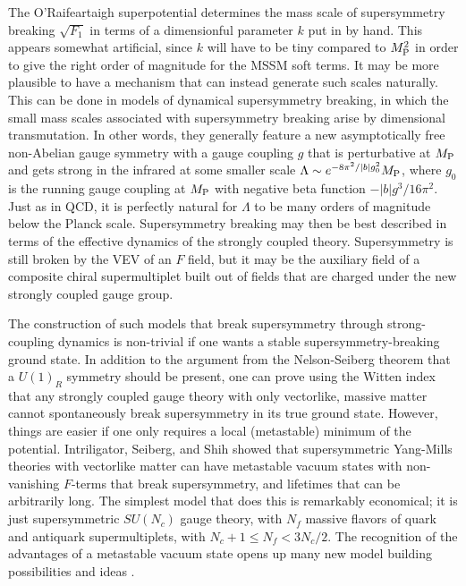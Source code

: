 \documentclass[11pt]{article}
\def\MPlanck{M_{\rm P}}
\begin{document}
The O'Rai\-f\-ear\-taigh superpotential determines the mass scale of
supersymmetry breaking $\sqrt{F_1}$ in terms of a dimensionful parameter
$k$ put in by hand. This appears somewhat artificial, since $k$ will have
to be tiny compared to $\MPlanck^2$ in order to give the right order of
magnitude for the MSSM soft terms. It may be more plausible to have a mechanism that
can instead generate such scales naturally. This can be done in models of
dynamical supersymmetry breaking, in which the small 
mass scales associated with supersymmetry breaking arise by
dimensional transmutation. In other words, they generally feature a new
asymptotically free non-Abelian gauge symmetry with a gauge coupling $g$
that is perturbative at $\MPlanck$ and gets strong in the infrared at some
smaller scale $\Lambda \sim e^{-8\pi^2/|b| g_0^2} \MPlanck$, where $g_0$
is the running gauge coupling at $\MPlanck$ with negative beta function $-
|b| g^3/16 \pi^2$. Just as in QCD, it is perfectly natural for $\Lambda$
to be many orders of magnitude below the Planck scale. Supersymmetry
breaking may then be best described in terms of the effective dynamics of
the strongly coupled theory. 
Supersymmetry is still broken by the VEV of an $F$ field, but it may be
the auxiliary field of a composite chiral supermultiplet built out
of fields that are charged under the new strongly coupled gauge group.

The construction of such models that break supersymmetry through strong-coupling dynamics is 
non-trivial if one wants a stable supersymmetry-breaking ground state. In addition to the 
argument from the Nelson-Seiberg theorem that a $U(1)_R$ symmetry should be present, one can 
prove using the Witten index \cite{Wittenindex,AffleckDineSeiberg} that any strongly coupled 
gauge theory with only vectorlike, massive matter cannot spontaneously break supersymmetry in 
its true ground state. However, things are easier if one only requires a local (metastable) 
minimum of the potential. Intriligator, Seiberg, and Shih showed \cite{Intriligator:2006dd} that 
supersymmetric Yang-Mills theories with vectorlike matter can have metastable vacuum states with 
non-vanishing $F$-terms that break supersymmetry, and lifetimes that can be arbitrarily long. The 
simplest model that does this is remarkably economical; it is just supersymmetric $SU(N_c)$ gauge 
theory, with $N_f$ massive flavors of quark and antiquark supermultiplets, with $N_c + 1 \leq N_f 
< 3 N_c/2$. The recognition of the advantages of a metastable vacuum state 
opens up many new model building possibilities and ideas 
\cite{Intriligator:2006dd,Intriligator:2007py,metastablemodels}.
\end{document}
